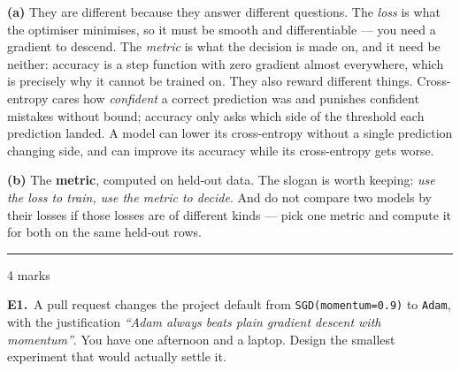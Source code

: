 \documentclass[10pt,a4paper]{article}
\newcommand{\parthead}[2]{\vspace{2pt}\noindent\rule{\linewidth}{0.4pt}\par\vspace{2pt}%
  \noindent{\bfseries Part #1}\hfill{\small #2}\par\vspace{1pt}}
\begin{document}
\textbf{(a)} They are different because they answer different questions. The \emph{loss} is what the optimiser minimises, so it must be smooth and differentiable --- you need a gradient to descend. The \emph{metric} is what the decision is made on, and it need be neither: accuracy is a step function with zero gradient almost everywhere, which is precisely why it cannot be trained on. They also reward different things. Cross-entropy cares how \emph{confident} a correct prediction was and punishes confident mistakes without bound; accuracy only asks which side of the threshold each prediction landed. A model can lower its cross-entropy without a single prediction changing side, and can improve its accuracy while its cross-entropy gets worse.\par\vspace{1mm}\textbf{(b)} The \textbf{metric}, computed on held-out data. The slogan is worth keeping: \emph{use the loss to train, use the metric to decide}. And do not compare two models by their losses if those losses are of different kinds --- pick one metric and compute it for both on the same held-out rows.

\newpage

\parthead{E --- Reasoning}{4 marks}

\textbf{E1.}\ A pull request changes the project default from \texttt{SGD(momentum=0.9)} to \texttt{Adam}, with the
justification \emph{``Adam always beats plain gradient descent with momentum''}. You have one afternoon and a
laptop. Design the smallest experiment that would actually settle it.

\vspace{4pt}
\end{document}
